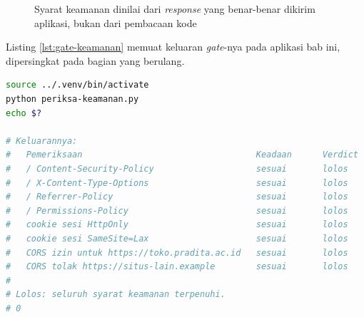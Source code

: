 \begin{figure}[!htb]
  \centering
  \caption{Syarat keamanan dinilai dari \textit{response} yang benar-benar
           dikirim aplikasi, bukan dari pembacaan kode}
  \label{fig:gate-keamanan}
\end{figure}

Listing \ref{lst:gate-keamanan} memuat keluaran \textit{gate}-nya pada aplikasi bab
ini, dipersingkat pada bagian yang berulang.

\begin{lstlisting}[language=bash, caption={Menjalankan gate keamanan, tersedia di \berkas{sources/chapter07/periksa-keamanan.py}}, label={lst:gate-keamanan}]
source ../.venv/bin/activate
python periksa-keamanan.py
echo $?

# Keluarannya:
#   Pemeriksaan                                  Keadaan      Verdict
#   / Content-Security-Policy                    sesuai       lolos
#   / X-Content-Type-Options                     sesuai       lolos
#   / Referrer-Policy                            sesuai       lolos
#   / Permissions-Policy                         sesuai       lolos
#   cookie sesi HttpOnly                         sesuai       lolos
#   cookie sesi SameSite=Lax                     sesuai       lolos
#   CORS izin untuk https://toko.pradita.ac.id   sesuai       lolos
#   CORS tolak https://situs-lain.example        sesuai       lolos
#
# Lolos: seluruh syarat keamanan terpenuhi.
# 0
\end{lstlisting}

